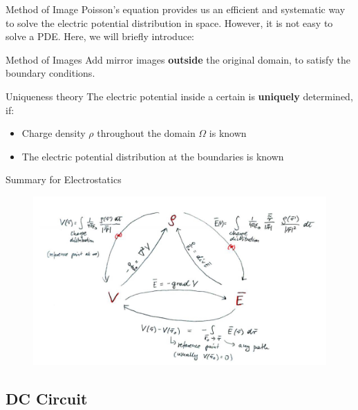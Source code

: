 \documentclass{beamer}
\begin{document}
\begin{frame}{Method of Image}
    Poisson's equation provides us an efficient and systematic way to solve the electric potential distribution in space.
    However, it is not easy to solve a PDE. Here, we will briefly introduce:
    \vspace{.5em}
    
    \begin{beamerboxesrounded}[shadow=true]{Method of Images}
        Add mirror images \textbf{outside} the original domain, to satisfy the boundary conditions.
    \end{beamerboxesrounded}
    \begin{block}{Uniqueness theory}
        The electric potential inside a certain is \textbf{uniquely} determined, if:
        \begin{itemize}
            \item Charge density $\rho$ throughout the domain $\Omega$ is known
            \item The electric potential distribution at the boundaries is known
        \end{itemize}
    \end{block}
\end{frame}

\begin{frame}{Summary for Electrostatics}
    \begin{figure}[htbp]
        \centering
        \includegraphics[width=\textwidth]{images/elec.jpg}
    \end{figure}
\end{frame}


\subsection{DC Circuit}
\end{document}
